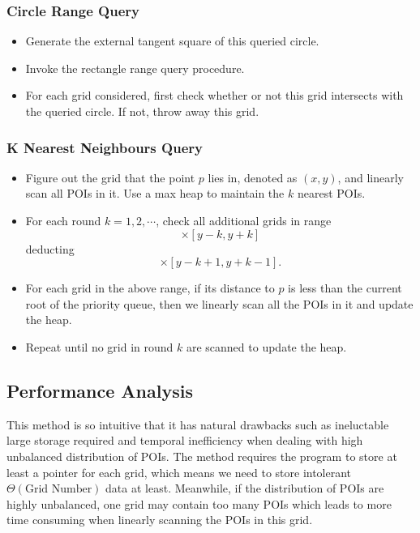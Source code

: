 \documentclass{acm_proc_article-sp}
\begin{document}
\subsubsection{Circle Range Query}
\begin{itemize}
\item Generate the external tangent square of this queried circle.
\item Invoke the rectangle range query procedure.
\item For each grid considered, first check whether or not this grid intersects with the queried circle. If not, throw away this grid.
\end{itemize}

\subsubsection{K Nearest Neighbours Query}
\begin{itemize}
\item Figure out the grid that the point $p$ lies in, denoted as $(x,y)$, and linearly scan all POIs in it. Use a max heap to maintain the $k$ nearest POIs.
\item For each round $k=1,2,\cdots$, check all additional grids in range 
\begin{equation}
[x-k, x+k]\times [y-k, y+k]
\end{equation}
deducting 
\begin{equation}
[x-k+1, x+k-1]\times [y-k+1, y+k-1]\mbox{.}
\end{equation}
\item For each grid in the above range, if its distance to $p$ is less than the current root of the priority queue, then we linearly scan all the POIs in it and update the heap.
\item Repeat until no grid in round $k$ are scanned to update the heap.
\end{itemize}

\subsection{Performance Analysis}

This method is so intuitive that it has natural drawbacks such as ineluctable large storage required and temporal inefficiency when dealing with high unbalanced distribution of POIs. The method requires the program to store at least a pointer for each grid, which means we need to store intolerant $\Theta(\mbox{Grid Number})$ data at least. Meanwhile, if the distribution of POIs are highly unbalanced, one grid may contain too many POIs which leads to more time consuming when linearly scanning the POIs in this grid.
\end{document}
